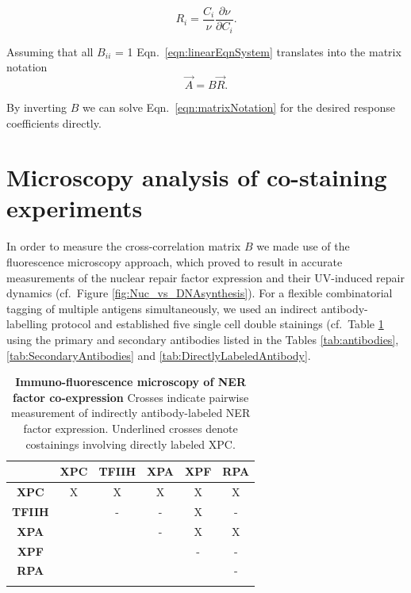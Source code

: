 \begin{equation}
R_i = \frac{C_i}{\nu}\frac{\partial \nu}{\partial C_i}.
\label{eqn:responseCoefficientsII}
\end{equation}

Assuming that all $B_{ii}$ = 1 Eqn.\ \ref{eqn:linearEqnSystem} translates into the matrix notation 
\begin{equation}
\vec{A} = B\vec{R}.
\label{eqn:matrixNotation}
\end{equation}

By inverting $B$ we can solve Eqn.\ \ref{eqn:matrixNotation} for the desired response coefficients directly. 


\section{Microscopy analysis of co-staining experiments}

In order to measure the cross-correlation matrix $B$ we made use of the fluorescence microscopy approach, which proved to result in accurate measurements of the nuclear repair factor expression and their UV-induced repair dynamics (cf.\ Figure \ref{fig:Nuc_vs_DNAsynthesis}). For a flexible combinatorial tagging of multiple antigens simultaneously, we used an indirect antibody-labelling protocol and established five single cell double stainings (cf.\ Table \ref{tab:co-staining} using the primary and secondary antibodies listed in the Tables \ref{tab:antibodies}, \ref{tab:SecondaryAntibodies} and \ref{tab:DirectlyLabeledAntibody}. 


\begin{table}[t!]
	\centering
	\begin{tabular}{cccccc}
		\hline
			\rule{0pt}{2ex}
			&\textbf{XPC} & \textbf{TFIIH} & \textbf{XPA} & \textbf{XPF} & \textbf{RPA}\\ \hline
			\rule{0pt}{3ex}
\textbf{XPC}&        X    &           X    & X            &         X    & X            \\ \hline
			\rule{0pt}{3ex}
\textbf{TFIIH}&           & -              & -            & X            & -             \\ \hline
			\rule{0pt}{3ex}
\textbf{XPA}&             &                & -            & X            & X             \\ \hline
			\rule{0pt}{3ex}
\textbf{XPF}&             &                &              & -            & -              \\ \hline
			\rule{0pt}{3ex}
\textbf{RPA}&             &                &              &              & -               \\ \hline
			\rule{0pt}{3ex}
		
	\end{tabular}
	\caption{\textbf{Immuno-fluorescence microscopy of NER factor co-expression} Crosses indicate pairwise measurement of indirectly antibody-labeled NER factor expression. Underlined crosses denote costainings involving directly labeled XPC. }\label{tab:co-staining}
\end{table}   


